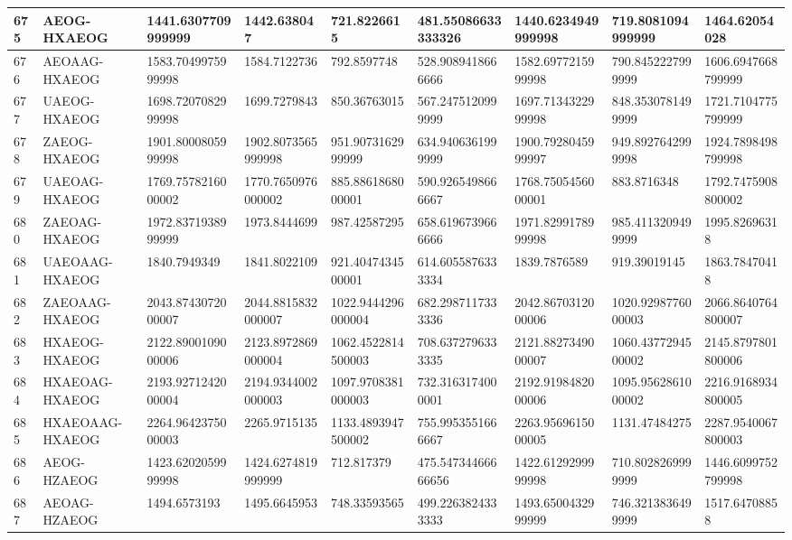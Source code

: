 {\begin{longtable}{|l|l|l|l|l|l|l|l|l|}
        675 & AEOG-HXAEOG & 1441.6307709999999 & 1442.638047 & 721.8226615 & 481.55086633333326 & 1440.6234949999998 & 719.8081094999999 & 1464.62054028 \\ \hline
        676 & AEOAAG-HXAEOG & 1583.7049975999998 & 1584.7122736 & 792.8597748 & 528.9089418666666 & 1582.6977215999998 & 790.8452227999999 & 1606.6947668799999 \\ \hline
        677 & UAEOG-HXAEOG & 1698.7207082999998 & 1699.7279843 & 850.36763015 & 567.2475120999999 & 1697.7134322999998 & 848.3530781499999 & 1721.7104775799999 \\ \hline
        678 & ZAEOG-HXAEOG & 1901.8000805999998 & 1902.8073565999998 & 951.9073162999999 & 634.9406361999999 & 1900.7928045999997 & 949.8927642999998 & 1924.7898498799998 \\ \hline
        679 & UAEOAG-HXAEOG & 1769.7578216000002 & 1770.7650976000002 & 885.8861868000001 & 590.9265498666667 & 1768.7505456000001 & 883.8716348 & 1792.7475908800002 \\ \hline
        680 & ZAEOAG-HXAEOG & 1972.8371938999999 & 1973.8444699 & 987.42587295 & 658.6196739666666 & 1971.8299178999998 & 985.4113209499999 & 1995.82696318 \\ \hline
        681 & UAEOAAG-HXAEOG & 1840.7949349 & 1841.8022109 & 921.4047434500001 & 614.6055876333334 & 1839.7876589 & 919.39019145 & 1863.78470418 \\ \hline
        682 & ZAEOAAG-HXAEOG & 2043.8743072000007 & 2044.8815832000007 & 1022.9444296000004 & 682.2987117333336 & 2042.8670312000006 & 1020.9298776000003 & 2066.8640764800007 \\ \hline
        683 & HXAEOG-HXAEOG & 2122.8900109000006 & 2123.8972869000004 & 1062.4522814500003 & 708.6372796333335 & 2121.8827349000007 & 1060.4377294500002 & 2145.8797801800006 \\ \hline
        684 & HXAEOAG-HXAEOG & 2193.9271242000004 & 2194.9344002000003 & 1097.9708381000003 & 732.3163174000001 & 2192.9198482000006 & 1095.9562861000002 & 2216.9168934800005 \\ \hline
        685 & HXAEOAAG-HXAEOG & 2264.9642375000003 & 2265.9715135 & 1133.4893947500002 & 755.9953551666667 & 2263.9569615000005 & 1131.47484275 & 2287.9540067800003 \\ \hline
        686 & AEOG-HZAEOG & 1423.6202059999998 & 1424.6274819999999 & 712.817379 & 475.54734466666656 & 1422.6129299999998 & 710.8028269999999 & 1446.6099752799998 \\ \hline
        687 & AEOAG-HZAEOG & 1494.6573193 & 1495.6645953 & 748.33593565 & 499.2263824333333 & 1493.6500432999999 & 746.3213836499999 & 1517.64708858 \\ \hline

\end{longtable}}
